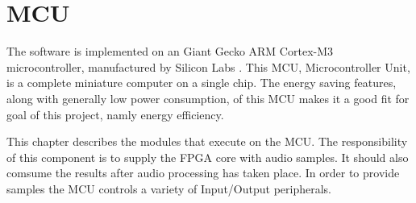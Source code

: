 \clearpage
\section{MCU} \label{section:mcu}

The software is implemented on an Giant Gecko ARM Cortex-M3 microcontroller, 
manufactured by Silicon Labs . 
This MCU, Microcontroller Unit, is a complete miniature computer on a single chip. 
The energy saving features, along with generally low power consumption, of this MCU 
makes it a good fit for goal of this project, namly energy efficiency. 

This chapter describes the modules that execute on the MCU. The responsibility 
of this component is to supply the FPGA core  with audio 
samples. It should also comsume the results after audio processing has taken 
place. In order to provide samples the MCU controls a variety of Input/Output 
peripherals. 





